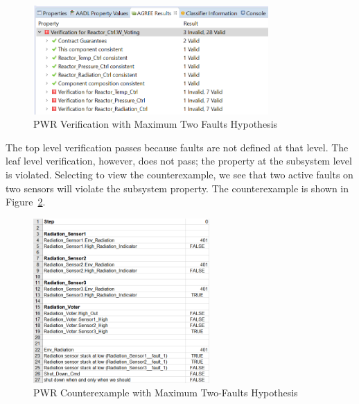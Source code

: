 \begin{figure}[h!]
		\includegraphics[width=0.8\textwidth]{images/maxNPWRVerif.png}
	\caption{PWR Verification with Maximum Two Faults Hypothesis}
	\label{fig:maxNPWRVerif}
\end{figure}

The top level verification passes because faults are not defined at that level. The leaf level verification, however, does not pass; the property at the subsystem level is violated. Selecting to view the counterexample, we see that two active faults on two sensors will violate the subsystem property. The counterexample is shown in Figure~\ref{fig:maxNPWRVerifCoex}. 

\begin{figure}[h!]
		\includegraphics[width=0.6\textwidth]{images/maxNPWRVerifCoex.png}
	\caption{PWR Counterexample with Maximum Two-Faults Hypothesis}
	\label{fig:maxNPWRVerifCoex}
\end{figure}

